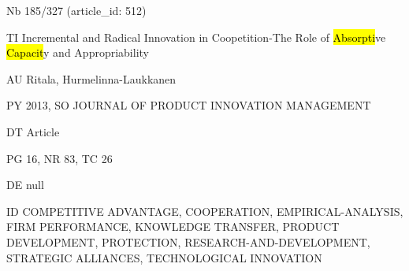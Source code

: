\documentclass[a4paper]{article}
\begin{document}
\vspace*{-2cm}
Nb \tabto{0cm}185/327 (article\_id: 512)\par
TI \tabto{0cm}Incremental and Radical Innovation in Coopetition-The Role of \hl{Absorpti}ve \hl{Capacit}y and Appropriability\par
AU \tabto{0cm}Ritala, Hurmelinna-Laukkanen\par
PY \tabto{0cm}2013, SO JOURNAL OF PRODUCT INNOVATION MANAGEMENT\par
DT \tabto{0cm}Article\par
PG \tabto{0cm}16, NR 83, TC 26\par
DE \tabto{0cm}null\par
ID \tabto{0cm}COMPETITIVE ADVANTAGE, COOPERATION, EMPIRICAL-ANALYSIS, FIRM PERFORMANCE, KNOWLEDGE TRANSFER, PRODUCT DEVELOPMENT, PROTECTION, RESEARCH-AND-DEVELOPMENT, STRATEGIC ALLIANCES, TECHNOLOGICAL INNOVATION\par
\end{document}
